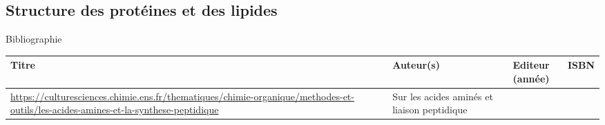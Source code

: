 \begin{headerBlock}
\chapter{Structure des protéines et des lipides}
\label{LC_ControleQualite}
 \end{headerBlock}



\begin{reportBlock}{Bibliographie}

\begin{center}
\begin{tabularx}{\textwidth}{| X | X | c | c |}\hline
Titre & Auteur(s) & Editeur (année) & ISBN \\ 
\hline
 \url{https://culturesciences.chimie.ens.fr/thematiques/chimie-organique/methodes-et-outils/les-acides-amines-et-la-synthese-peptidique} & Sur les acides aminés et liaison peptidique & & \\ 
 \hline
\end{tabularx}
\end{center}

\end{reportBlock}

